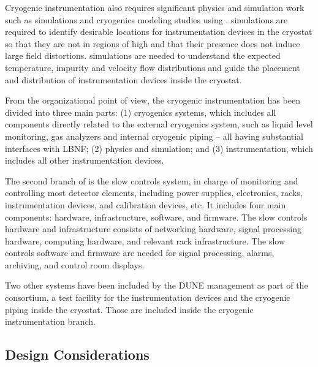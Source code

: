 Cryogenic instrumentation also requires significant physics and
simulation work such as \efield simulations and cryogenics modeling
studies using . \efield simulations
are required to identify desirable locations for instrumentation
devices in the cryostat so that they are not in regions of high \efield and
that their presence does not induce large field distortions. 
simulations are needed to understand the expected temperature,
impurity and velocity flow distributions and guide the placement and
distribution of instrumentation devices inside the cryostat.


From the organizational point of view, the 
cryogenic instrumentation has been divided into three main parts: (1) cryogenics systems, which includes all components directly related to the external cryogenics system, such as
liquid level monitoring, gas analyzers and internal cryogenic piping -- all having substantial interfaces with LBNF; (2)  physics and simulation; and (3) \lar  instrumentation, which includes all
other instrumentation devices. 

The second branch of  is the slow controls system, in charge of monitoring and controlling most detector elements, including power supplies, electronics, racks, instrumentation devices, and  
calibration devices, etc. It includes four main components: hardware, infrastructure,
software, and firmware. The slow controls hardware and infrastructure consists of
networking hardware, signal processing hardware, computing hardware, and relevant
rack infrastructure. The slow controls software and firmware are needed for
signal processing, alarms, archiving, and control room displays.

Two other systems have been included by the DUNE management as part of the  consortium, a test facility for the instrumentation devices and the cryogenic piping inside the cryostat. Those are included inside the cryogenic instrumentation branch.



\subsection{Design Considerations}
\label{sec:fddp-slow-cryo-des-consid}


